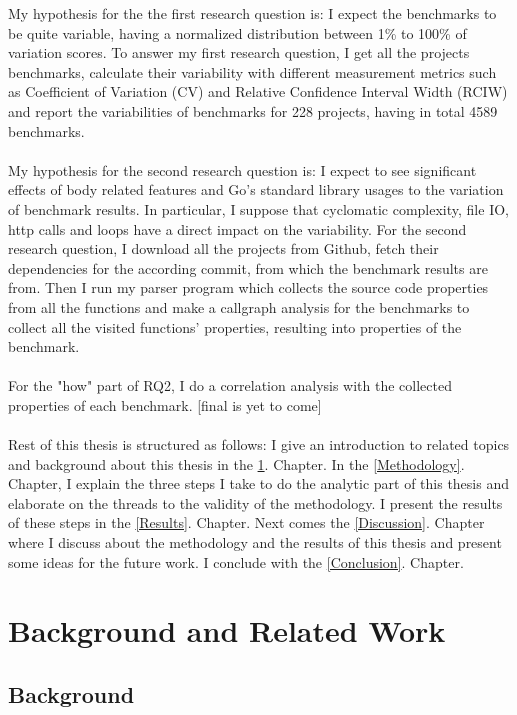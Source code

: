\documentclass{seal_thesis}
\begin{document}
\noindent My hypothesis for the the first research question is: I expect the benchmarks to be quite variable, having a normalized distribution between 1\% to 100\% of variation scores. To answer my first research question, I get all the projects benchmarks, calculate their variability with different measurement metrics such as Coefficient of Variation (CV) and Relative Confidence Interval Width (RCIW) and report the variabilities of benchmarks for 228 projects, having in total 4589 benchmarks.\\
\\
My hypothesis for the second research question is: I expect to see significant effects of body related features and Go's standard library usages to the variation of benchmark results. In particular, I suppose that cyclomatic complexity, file IO, http calls and loops have a direct impact on the variability. For the second research question, I download all the projects from Github, fetch their dependencies for the according commit, from which the benchmark results are from. Then I run my parser program which collects the source code properties from all the functions and make a callgraph analysis for the benchmarks to collect all the visited functions' properties, resulting into properties of the benchmark.\\
\\
For the "how" part of RQ2, I do a correlation analysis with the collected properties of each benchmark. [final is yet to come]\\
\\ 
Rest of this thesis is structured as follows: I give an introduction to related topics and background about this thesis in the \ref{Background and Related Work}. Chapter. In the \ref{Methodology}. Chapter, I explain the three steps I take to do the analytic part of this thesis and elaborate on the threads to the validity of the methodology. I present the results of these steps in the \ref{Results}. Chapter. Next comes the \ref{Discussion}. Chapter where I discuss about the methodology and the results of this thesis and present some ideas for the future work. I conclude with the \ref{Conclusion}. Chapter.

\chapter{Background and Related Work}
\label{Background and Related Work}

\section{Background}
\end{document}
